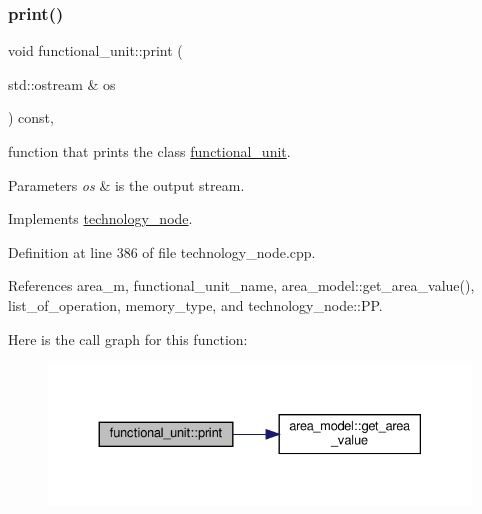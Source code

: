 \subsubsection{\texorpdfstring{print()}{print()}}
{\footnotesize\ttfamily void functional\+\_\+unit\+::print (\begin{DoxyParamCaption}\item[{std\+::ostream \&}]{os }\end{DoxyParamCaption}) const\hspace{0.3cm}{\ttfamily [override]}, {\ttfamily [virtual]}}



function that prints the class \hyperlink{structfunctional__unit}{functional\+\_\+unit}. 


\begin{DoxyParams}{Parameters}
{\em os} & is the output stream. \\
\hline
\end{DoxyParams}


Implements \hyperlink{structtechnology__node_a44f347bae9b9b59726f323b5a6ad9ebf}{technology\+\_\+node}.



Definition at line 386 of file technology\+\_\+node.\+cpp.



References area\+\_\+m, functional\+\_\+unit\+\_\+name, area\+\_\+model\+::get\+\_\+area\+\_\+value(), list\+\_\+of\+\_\+operation, memory\+\_\+type, and technology\+\_\+node\+::\+PP.

Here is the call graph for this function\+:
\nopagebreak
\begin{figure}[H]
\begin{center}
\leavevmode
\includegraphics[width=330pt]{d8/dd6/structfunctional__unit_a2ab8e656144661fc27df14e7d5649dde_cgraph}
\end{center}
\end{figure}
\mbox{\label{structfunctional__unit_a99dbc918a7d0b2a6ba20ac4161961a64}} 

